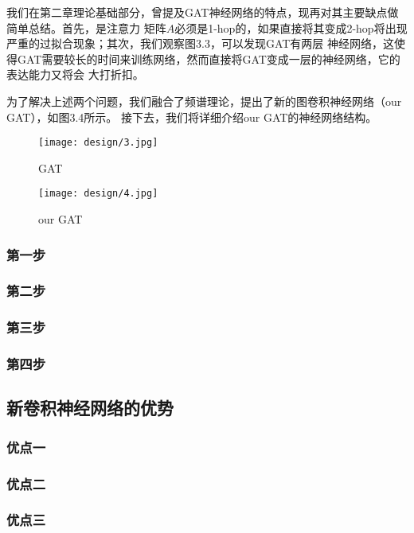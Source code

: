 我们在第二章理论基础部分，曾提及GAT神经网络的特点，现再对其主要缺点做简单总结。首先，是注意力
矩阵$A$必须是1-hop的，如果直接将其变成2-hop将出现严重的过拟合现象；其次，我们观察图3.3，可以发现GAT有两层
神经网络，这使得GAT需要较长的时间来训练网络，然而直接将GAT变成一层的神经网络，它的表达能力又将会
大打折扣。

为了解决上述两个问题，我们融合了频谱理论，提出了新的图卷积神经网络（our GAT），如图3.4所示。
接下去，我们将详细介绍our GAT的神经网络结构。
\begin{figure}[htbp]
    \centering
    \begin{minipage}[t]{0.48\textwidth}
    \centering
    \captionsetup{width=5cm}
    \texttt{[image: design/3.jpg]}
    \caption{\label{2-3}GAT}
    \end{minipage}
    \begin{minipage}[t]{0.48\textwidth}
    \centering
    \captionsetup{width=5cm}
    \texttt{[image: design/4.jpg]}
    \caption{\label{2-4}our GAT}
    \end{minipage}
\end{figure}
\subsubsection{第一步}
\subsubsection{第二步}
\subsubsection{第三步}
\subsubsection{第四步}

\subsection{新卷积神经网络的优势}
\subsubsection{优点一}
\subsubsection{优点二}
\subsubsection{优点三}